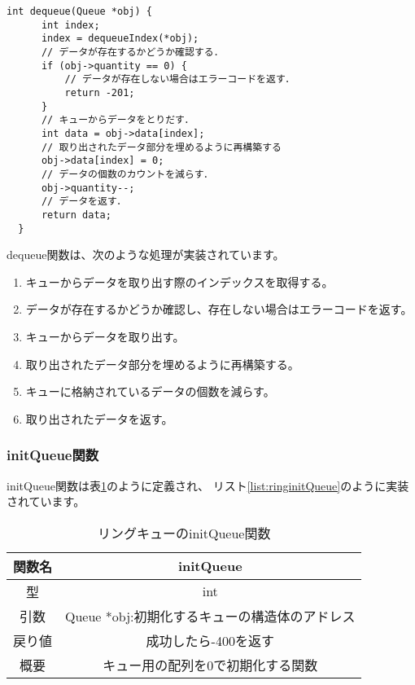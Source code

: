 \documentclass[a4j]{jarticle}
\begin{document}
\begin{lstlisting}[caption=リングキューのdequeue関数の実装,label=list:ringdequeue]
  int dequeue(Queue *obj) {
      int index;
      index = dequeueIndex(*obj);
      // データが存在するかどうか確認する．
      if (obj->quantity == 0) {
          // データが存在しない場合はエラーコードを返す．
          return -201;
      }
      // キューからデータをとりだす．
      int data = obj->data[index];
      // 取り出されたデータ部分を埋めるように再構築する
      obj->data[index] = 0;
      // データの個数のカウントを減らす．
      obj->quantity--;
      // データを返す．
      return data;
  }
\end{lstlisting}

dequeue関数は、次のような処理が実装されています。
\begin{enumerate}
  \item キューからデータを取り出す際のインデックスを取得する。
  \item データが存在するかどうか確認し、存在しない場合はエラーコードを返す。
  \item キューからデータを取り出す。
  \item 取り出されたデータ部分を埋めるように再構築する。
  \item キューに格納されているデータの個数を減らす。
  \item 取り出されたデータを返す。
\end{enumerate}

\subsubsection{initQueue関数}
initQueue関数は表\ref{table:ringinitQueue}のように定義され、
リスト\ref{list:ringinitQueue}のように実装されています。
\begin{table}[htbp]
  \centering
  \caption{リングキューのinitQueue関数}
  \label{table:ringinitQueue}
  \begin{tabular}{|c|c|}
    \hline
    関数名 & initQueue                    \\
    \hline
    型   & int                          \\
    \hline
    引数  & Queue *obj:初期化するキューの構造体のアドレス \\
    \hline
    戻り値 & 成功したら-400を返す                 \\
    \hline
    概要  & キュー用の配列を0で初期化する関数            \\
    \hline
  \end{tabular}
\end{table}
\end{document}

